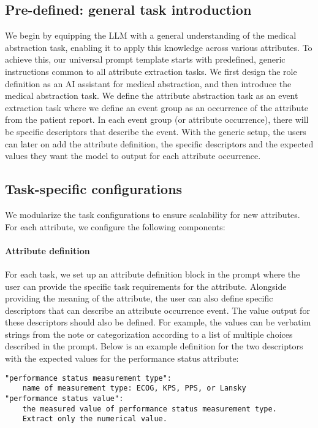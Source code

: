 \subsection{Pre-defined: general task introduction}
We begin by equipping the \ac{LLM} with a general understanding of the medical abstraction task, enabling it to apply this knowledge across various attributes. To achieve this, our universal prompt template starts with predefined, generic instructions common to all attribute extraction tasks. We first design the role definition as an AI assistant for medical abstraction, and then introduce the medical abstraction task. We define the attribute abstraction task as an event extraction task where we define an event group as an occurrence of the attribute from the patient report. In each event group (or attribute occurrence), there will be specific descriptors that describe the event.
With the generic setup, the users can later on add the attribute definition, the specific descriptors and the expected values they want the model to output for each attribute occurrence. 

\subsection{Task-specific configurations}


We modularize the task configurations to ensure scalability for new attributes. For each attribute, we configure the following components:

\paragraph{Attribute definition} For each task, we set up an attribute definition block in the prompt where the user can provide the specific task requirements for the attribute. Alongside providing the meaning of the attribute, the user can also define specific descriptors that can describe an attribute occurrence event. The value output for these descriptors should also be defined. For example, the values can be verbatim strings from the note or categorization according to a list of multiple choices described in the prompt. 
Below is an example definition for the two descriptors with the expected values for the performance status attribute:

\begin{verbatim}
"performance status measurement type": 
    name of measurement type: ECOG, KPS, PPS, or Lansky
"performance status value":
    the measured value of performance status measurement type.
    Extract only the numerical value.

\end{verbatim}

